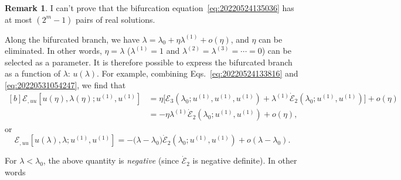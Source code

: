 \documentclass[12pt, final]{scrartcl}
\theoremstyle{definition}
\newtheorem{remark}{Remark}
\newcommand{\E}{\mathcal E}
\newcommand{\order}[2][1]{#2^{(#1)}}
\begin{document}
\begin{remark}
  I can't prove that the bifurcation equation~\eqref{eq:20220524135036} has at
  most $(2^m - 1)$ pairs of real solutions.
\end{remark}

Along the bifurcated branch, we have $\lambda = \lambda_0 + \eta \order[1]\lambda + o(\eta)$, and $\eta$ can be
eliminated. In other words, $\eta=\lambda$ ($\order[1]\lambda=1$ and $\order[2]\lambda = \order[3]\lambda = \cdots = 0$) can
be selected as a parameter. It is therefore possible to express the bifurcated
branch as a function of $\lambda$: $u(\lambda)$. For example, combining
Eqs.~\eqref{eq:20220524133816} and \eqref{eq:20220531054247}, we find that
\begin{equation}
  \begin{aligned}[b]
    \E_{, uu}[u(\eta), \lambda(\eta); \order[1]u, \order[1]u]
    &= \eta \bigl[\E_3(\lambda_0 ; \order[1]u, \order[1]u, \order[1]u)  + \order[1]\lambda \dot{\E}_2(\lambda_0; \order[1]u, \order[1]u)\bigr] + o(\eta)\\
    &= - \eta \order[1]\lambda \dot{\E}_2(\lambda_0; \order[1]u, \order[1]u) + o(\eta),
  \end{aligned}
\end{equation}
or
\begin{equation}
  \label{eq:20220819160235}
  \E_{, uu}[u(\lambda), \lambda; \order[1]u, \order[1]u] = -\bigl( \lambda - \lambda_0 \bigr) \dot{\E}_2(\lambda_0; \order[1]u, \order[1]u) + o(\lambda - \lambda_0).
\end{equation}

For $\lambda < \lambda_0$, the above quantity is \emph{negative} (since $\dot{\E}_2$ is
negative definite). In other words

\begin{center}
\end{center}
\end{document}
